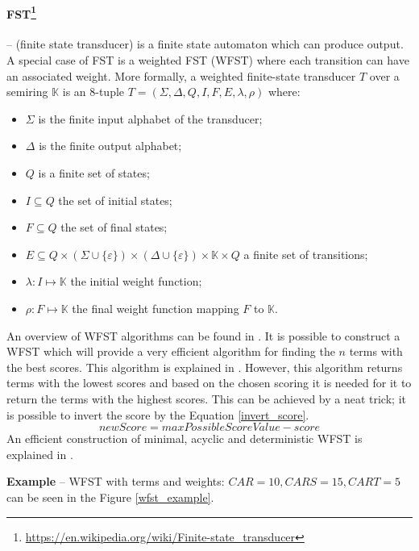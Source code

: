\paragraph{FST\protect\footnote{\url{https://en.wikipedia.org/wiki/Finite-state\_transducer}}} \label{FST} –
(finite state transducer) is a finite state
automaton which can produce output. A special case of FST is a weighted FST (WFST) where each transition can have an
associated weight. More formally, a weighted finite-state transducer $T$ over a semiring $\mathbb{K}$ is
an 8-tuple $T = (\Sigma,\Delta,Q,I,F,E,\lambda,\rho)$ where:
\begin{itemize}
    \item $\Sigma$ is the finite input alphabet of the transducer;
    \item $\Delta$ is the finite output alphabet;
    \item $Q$ is a finite set of states;
    \item $I \subseteq Q$ the set of initial states;
    \item $F \subseteq Q$ the set of final states;
    \item $E \subseteq Q\times(\Sigma\cup\{\varepsilon\})\times(\Delta\cup \{\varepsilon\}) \times \mathbb{K} \times Q$ a finite set of transitions;
    \item $\lambda : I \mapsto \mathbb{K}$ the initial weight function;
    \item $\rho : F \mapsto \mathbb{K}$ the final weight function mapping $F$ to $\mathbb{K}$.
\end{itemize}
An overview of WFST algorithms can be found in \citep{Mohri2004WeightedFT}.
It is possible to construct a WFST which will provide a very efficient algorithm for finding the
$n$ terms with the best scores. This algorithm is explained in \citep{Mohri02anefficient}. However, this algorithm returns
terms with the lowest scores and based on the chosen scoring it is needed for it to return the terms with the highest
scores. This can be achieved by a neat trick; it is possible to invert the score by the Equation \ref{invert_score}.
\begin{equation}
\label{invert_score}
newScore = maxPossibleScoreValue - score
\end{equation}
An efficient construction of minimal, acyclic and deterministic WFST is explained in \citep{Mihov01directconstruction}.

\textbf{Example} – WFST with terms and weights: $CAR = 10, CARS = 15, CART = 5$ can be seen in the Figure \ref{wfst_example}.

